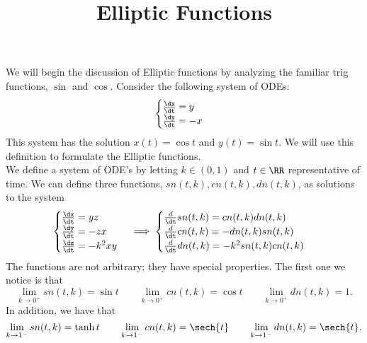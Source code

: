 \documentclass[notitlepage]{hw}
\title{Elliptic Functions}
\date{}
\author{}
\begin{document}
\maketitle

We will begin the discussion of Elliptic functions by analyzing the familiar trig functions, $\sin$ and
$\cos$. Consider the following system of ODEs:
\[
\begin{cases}
\frac{\dx}{\dt} = y\\
\frac{\dy}{\dt} = -x
\end{cases}
\]
This system has the solution $x(t)=\cos{t}$ and $y(t)=\sin{t}$. We will use this definition to formulate
the Elliptic functions.\\

We define a system of ODE's by letting $k\in(0,1)$ and $t\in\RR$ representative of time. We can define
three functions, $sn(t,k),cn(t,k),dn(t,k)$, as solutions to the system
\[
\begin{cases}
\frac{\dx}{\dt} = yz\\
\frac{\dy}{\dt} = -zx\\
{\dz\over\dt}=-k^{2}xy
\end{cases}
\implies
\begin{cases}
{d\over\dt}sn(t,k)=cn(t,k)dn(t,k)\\
{d\over\dt}cn(t,k)=-dn(t,k)sn(t,k)\\
{d\over\dt}dn(t,k)=-k^{2}sn(t,k)cn(t,k)
\end{cases}
\]
The functions are not arbitrary; they have special properties. The first one we notice is that
\[
\lim_{k\to0^{+}}sn(t,k)=\sin{t}
\qquad\lim_{k\to0^{+}}cn(t,k)=\cos{t}
\qquad\lim_{k\to0^{+}}dn(t,k)=1.
\]
In addition, we have that
\[
\lim_{k\to1^{-}}sn(t,k)=\tanh{t}
\qquad\lim_{k\to1^{-}}cn(t,k)=\sech{t}
\qquad\lim_{k\to1^{-}}dn(t,k)=\sech{t}.
\]
\end{document}
